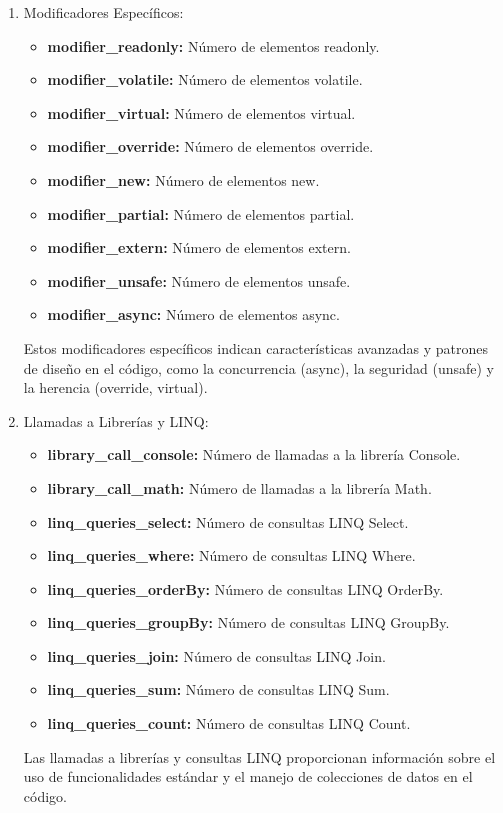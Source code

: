 \begin{enumerate}
    \item Modificadores Específicos:
    \begin{itemize}
        \item {\bf modifier_readonly:} Número de elementos readonly.
        \item {\bf modifier_volatile:} Número de elementos volatile.
        \item {\bf modifier_virtual:} Número de elementos virtual.
        \item {\bf modifier_override:} Número de elementos override.
        \item {\bf modifier_new:} Número de elementos new.
        \item {\bf modifier_partial:} Número de elementos partial.
        \item {\bf modifier_extern:} Número de elementos extern.
        \item {\bf modifier_unsafe:} Número de elementos unsafe.
        \item {\bf modifier_async:} Número de elementos async.
    \end{itemize}
    Estos modificadores específicos indican características avanzadas y patrones de diseño en el código, como la concurrencia (async), la seguridad (unsafe) y la herencia (override, virtual).

    \item Llamadas a Librerías y LINQ:
    \begin{itemize}
        \item {\bf library_call_console:} Número de llamadas a la librería Console.
        \item {\bf library_call_math:} Número de llamadas a la librería Math.
        \item {\bf linq_queries_select:} Número de consultas LINQ Select.
        \item {\bf linq_queries_where:} Número de consultas LINQ Where.
        \item {\bf linq_queries_orderBy:} Número de consultas LINQ OrderBy.
        \item {\bf linq_queries_groupBy:} Número de consultas LINQ GroupBy.
        \item {\bf linq_queries_join:} Número de consultas LINQ Join.
        \item {\bf linq_queries_sum:} Número de consultas LINQ Sum.
        \item {\bf linq_queries_count:} Número de consultas LINQ Count.
    \end{itemize}
    Las llamadas a librerías y consultas LINQ proporcionan información sobre el uso de funcionalidades estándar y el manejo de colecciones de datos en el código.


\end{enumerate}
